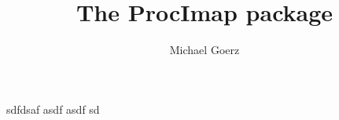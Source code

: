 \documentclass[a4paper,10pt]{howto}
\title{The ProcImap package}
\author{Michael Goerz}
\begin{document}
\maketitle

sdfdsaf asdf asdf sd
\end{document}
